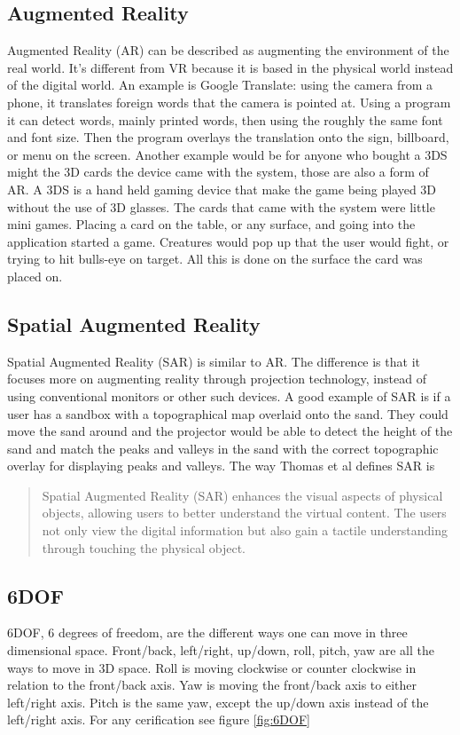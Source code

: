 \documentclass{sig-alternate}
\begin{document}
\subsection{Augmented Reality}
\label{sec:Augmented Reality}
Augmented Reality (AR) can be described as augmenting the environment of the real world. It's different from VR because it is based in the physical world instead of the digital world. An example is Google Translate: using the camera from a phone, it translates foreign words that the camera is pointed at. Using a program it can detect words, mainly printed words, then using the roughly the same font and font size. Then the program overlays the translation onto the sign, billboard, or menu on the screen. Another example would be for anyone who bought a 3DS might the 3D cards the device came with the system, those are also a form of AR. A 3DS is a hand held gaming device that make the game being played 3D without the use of 3D glasses. The cards that came with the system were little mini games. Placing a card on the table, or any surface, and going into the application started a game. Creatures would pop up that the user would fight, or trying to hit bulls-eye on target. All this is done on the surface the card was placed on.   

\subsection{Spatial Augmented Reality}
\label{sec:Spatial Augmented Reality}
Spatial Augmented Reality (SAR) is similar to AR. The difference is that it focuses more on augmenting reality through projection technology, instead of using conventional monitors or other such devices. A good example of SAR is if a user has a sandbox with a topographical map overlaid onto the sand. They could move the sand around and the projector would be able to detect the height of the sand and match the peaks and valleys in the sand with the correct topographic overlay for displaying peaks and valleys. The way Thomas et al \cite{3D} defines SAR is 
\begin{quote}
Spatial Augmented Reality (SAR) enhances the visual aspects of physical objects, allowing users to better understand the virtual content. The users not only view the digital information but also gain a tactile understanding through touching the physical object.
\end{quote}

\subsection{6DOF}
\label{sec:6DOF}
6DOF, 6 degrees of freedom, are the different ways one can move in three dimensional space. Front/back, left/right, up/down, roll, pitch, yaw are all the ways to move in 3D space. Roll is moving clockwise or counter clockwise in relation to the front/back axis. Yaw is moving the front/back axis to either left/right axis. Pitch is the same yaw, except the up/down axis instead of the left/right axis. For any cerification see figure \ref{fig:6DOF}
\end{document}
